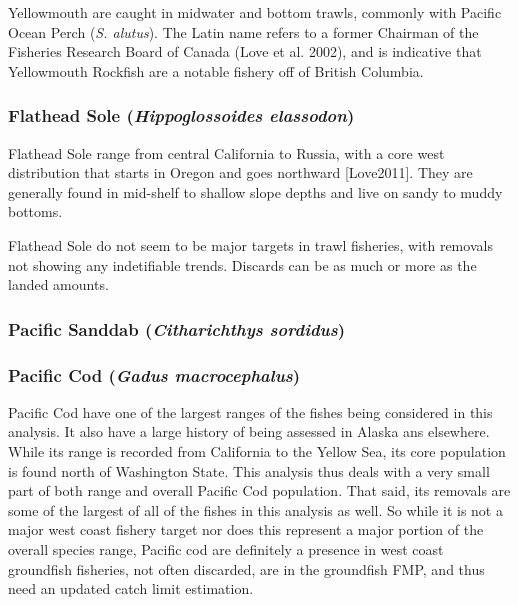 \documentclass[
  letterpaper,
]{article}
\begin{document}
Yellowmouth are caught in midwater and bottom trawls, commonly with
Pacific Ocean Perch (\emph{S. alutus}). The Latin name refers to a
former Chairman of the Fisheries Research Board of Canada (Love et al.
2002), and is indicative that Yellowmouth Rockfish are a notable fishery
off of British Columbia.

\subsubsection{\texorpdfstring{Flathead Sole (\emph{Hippoglossoides
elassodon})}{Flathead Sole (Hippoglossoides elassodon)}}\label{flathead-sole-hippoglossoides-elassodon}

Flathead Sole range from central California to Russia, with a core west
distribution that starts in Oregon and goes northward {[}Love2011{]}.
They are generally found in mid-shelf to shallow slope depths and live
on sandy to muddy bottoms.

Flathead Sole do not seem to be major targets in trawl fisheries, with
removals not showing any indetifiable trends. Discards can be as much or
more as the landed amounts.

\subsubsection{\texorpdfstring{Pacific Sanddab (\emph{Citharichthys
sordidus})}{Pacific Sanddab (Citharichthys sordidus)}}\label{pacific-sanddab-citharichthys-sordidus}

\subsubsection{\texorpdfstring{Pacific Cod (\emph{Gadus
macrocephalus})}{Pacific Cod (Gadus macrocephalus)}}\label{pacific-cod-gadus-macrocephalus}

Pacific Cod have one of the largest ranges of the fishes being
considered in this analysis. It also have a large history of being
assessed in Alaska ans elsewhere. While its range is recorded from
California to the Yellow Sea, its core population is found north of
Washington State. This analysis thus deals with a very small part of
both range and overall Pacific Cod population. That said, its removals
are some of the largest of all of the fishes in this analysis as well.
So while it is not a major west coast fishery target nor does this
represent a major portion of the overall species range, Pacific cod are
definitely a presence in west coast groundfish fisheries, not often
discarded, are in the groundfish FMP, and thus need an updated catch
limit estimation.
\end{document}
